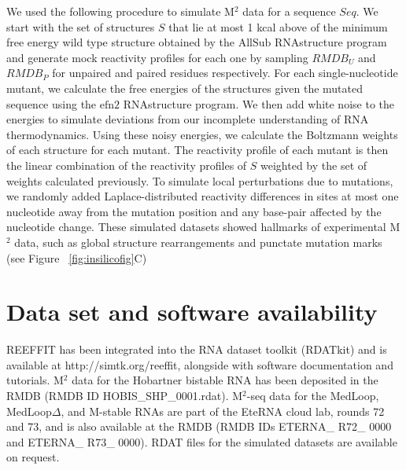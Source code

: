 \documentclass[12pt]{article}
\begin{document}
We used the following procedure to simulate M$^2$ data for a sequence $Seq$. 
We start with the set of structures $S$ that lie at most 1 kcal above of the minimum free energy wild type structure obtained by the $\mbox{AllSub}$ RNAstructure program and generate mock reactivity profiles for each one by sampling $RMDB_U$ and $RMDB_P$ for unpaired and paired residues respectively. 
For each single-nucleotide mutant, we calculate the free energies of the structures given the mutated sequence using the $\mbox{efn2}$ RNAstructure program. 
We then add white noise to the energies to simulate deviations from our incomplete understanding of RNA thermodynamics. Using these noisy energies, we calculate the Boltzmann weights of each structure for each mutant. 
The reactivity profile of each mutant is then the linear combination of the reactivity profiles of $S$ weighted by the set of weights calculated previously. 
To simulate local perturbations due to mutations, we randomly added Laplace-distributed reactivity differences in sites at most one nucleotide away from the mutation position and any base-pair affected by the nucleotide change. 
These simulated datasets showed hallmarks of experimental M$^2$ data, such as global structure rearrangements  and punctate mutation marks (see Figure ~\ref{fig:insilicofig}C)



\section{Data set and software availability}

REEFFIT has been integrated into the RNA dataset toolkit (RDATkit) and is available at http://simtk.org/reeffit, alongside with software documentation and tutorials. 
M$^2$ data for the Hobartner bistable RNA has been deposited in the RMDB (RMDB ID HOBIS\_SHP\_0001.rdat). 
M$^2$-seq data for the MedLoop, MedLoop$\Delta$, and M-stable RNAs are part of the EteRNA cloud lab, rounds 72 and 73, and is also available at the RMDB (RMDB IDs ETERNA\_ R72\_ 0000 and ETERNA\_ R73\_ 0000). 
RDAT files for the simulated datasets are available on request.



\end{document}
